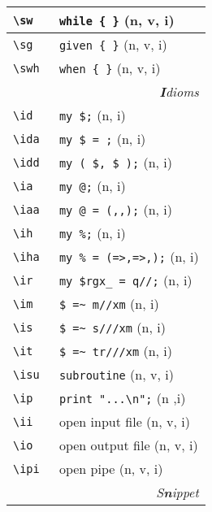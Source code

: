 \documentclass[oneside,10pt,landscape,DIV17]{scrartcl}
\begin{document}
\begin{multicols}{3}
\begin{center}
\begin{tabular}[]{|p{11mm}|p{60mm}|}
\hline \verb'\sw'      & \verb'while { }'             \hfill (n, v, i)\\
\hline \verb'\sg'      & \verb'given { }'             \hfill (n, v, i)\\
\hline \verb'\swh'     & \verb'when { }'              \hfill (n, v, i)\\
\hline
\hline
\multicolumn{2}{|r|}{\textsl{\textbf{I}dioms}}                 \\[1.0ex]
\hline \verb'\id  '  & \verb'my $;'              \hfill (n, i)   \\
\hline \verb'\ida '  & \verb'my $ = ;'           \hfill (n, i)   \\
\hline \verb'\idd '  & \verb'my ( $, $ );'       \hfill (n, i)   \\
\hline \verb'\ia  '  & \verb'my @;'              \hfill (n, i)   \\
\hline \verb'\iaa '  & \verb'my @ = (,,);'       \hfill (n, i)   \\
\hline \verb'\ih  '  & \verb'my %;'              \hfill (n, i)   \\
\hline \verb'\iha '  & \verb'my % = (=>,=>,);'   \hfill (n, i)   \\
%
\hline \verb'\ir'  & \verb'my $rgx_ = q//;'    \hfill (n, i)   \\
\hline \verb'\im'  & \verb'$ =~ m//xm'         \hfill (n, i)   \\
\hline \verb'\is'  & \verb'$ =~ s///xm'        \hfill (n, i)   \\
\hline \verb'\it'  & \verb'$ =~ tr///xm'       \hfill (n, i)   \\
\hline \verb'\isu' & \verb'subroutine'         \hfill (n, v, i)\\
\hline \verb'\ip'  & \verb'print "...\n";'     \hfill (n ,i)   \\
\hline \verb'\ii'  & open input file           \hfill (n, v, i)\\
\hline \verb'\io'  & open output file          \hfill (n, v, i)\\
\hline \verb'\ipi' & open pipe                 \hfill (n, v, i)\\
\hline
\hline
\multicolumn{2}{|r|}{\textsl{S\textbf{n}ippet}}                \\[1.0ex]

\end{tabular}
\end{center}
\end{multicols}
\end{document}
